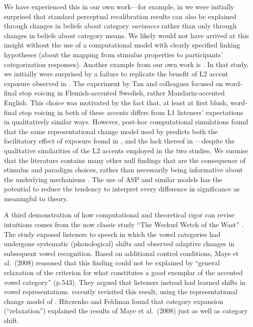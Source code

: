 \documentclass[
  11pt,
  man,floatsintext]{apa6}
\begin{document}
We have experienced this in our own work---for example, in \textcite{kleinschmidt-jaeger2015} we were initially surprised that standard perceptual recalibration results can also be explained through changes in beliefs about category \emph{variances} rather than only through changes in beliefs about category means. We likely would not have arrived at this insight without the use of a computational model with clearly specified linking hypotheses (about the mapping from stimulus properties to participants' categorization responses). Another example from our own work is \textcite{tan2021}. In that study, we initially were surprised by a failure to replicate the benefit of L2 accent exposure observed in \textcite{xie2016jep}. The experiment by Tan and colleagues focused on word-final stop voicing in Flemish-accented Swedish, rather Mandarin-accented English. This choice was motivated by the fact that, at least at first blush, word-final stop voicing in both of these accents differs from L1 listeners' expectations in qualitatively similar ways. However, post-hoc computational simulations found that the same representational change model used by \textcite{kleinschmidt-jaeger2015} predicts both the facilitatory effect of exposure found in \textcite{xie2016jep}, and the lack thereof in \textcite{tan2021} ---despite the qualitative similarities of the L2 accents employed in the two studies. We surmise that the literature contains many other null findings that are the consequence of stimulus and paradigm choices, rather than necessarily being informative about the underlying mechanisms \autocites[see e.g.,][]{floccia2006,zheng-samuel2020}. The use of ASP and similar models has the potential to reduce the tendency to interpret every difference in significance as meaningful to theory.

A third demonstration of how computational and theoretical rigor can revise intuitions comes from the now classic study ``The Weckud Wetch of the Wast'' \autocite{maye2008}. The study exposed listeners to speech in which the vowel categories had undergone systematic (phonological) shifts and observed adaptive changes in subsequent vowel recognition. Based on additional control conditions, Maye et al.~(2008) reasoned that this finding could not be explained by ``general relaxation of the criterion for what constitutes a good exemplar of the accented vowel category'' (p.543). They argued that listeners instead had learned shifts in vowel representations. \textcite{hitczenko-feldman2016} recently revisited this result, using the representational change model of \textcite{kleinschmidt-jaeger2015}. Hitczenko and Feldman found that category expansion (``relaxation'') explained the results of Maye et al.~(2008) just as well as category shift.
\end{document}
